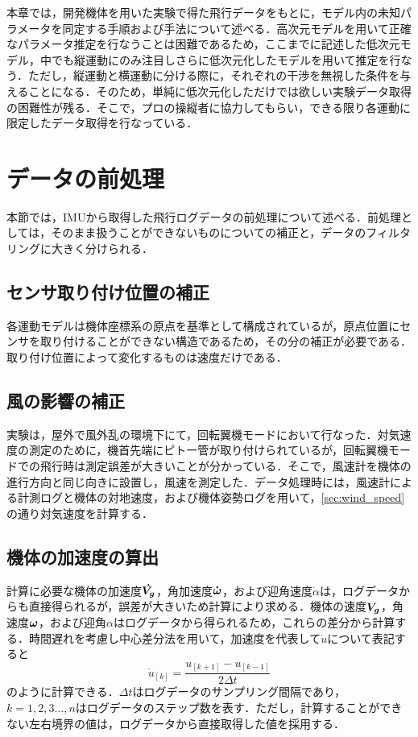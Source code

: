 
本章では，開発機体を用いた実験で得た飛行データをもとに，モデル内の未知パラメータを同定する手順および手法について述べる．高次元モデルを用いて正確なパラメータ推定を行なうことは困難であるため，ここまでに記述した低次元モデル，中でも縦運動にのみ注目しさらに低次元化したモデルを用いて推定を行なう．ただし，縦運動と横運動に分ける際に，それぞれの干渉を無視した条件を与えることになる．そのため，単純に低次元化しただけでは欲しい実験データ取得の困難性が残る．そこで，プロの操縦者に協力してもらい，できる限り各運動に限定したデータ取得を行なっている．\label{da}

\section{データの前処理}

本節では，IMUから取得した飛行ログデータの前処理について述べる．前処理としては，そのまま扱うことができないものについての補正と，データのフィルタリングに大きく分けられる．

\subsection{センサ取り付け位置の補正}

各運動モデルは機体座標系の原点を基準として構成されているが，原点位置にセンサを取り付けることができない構造であるため，その分の補正が必要である．取り付け位置によって変化するものは速度だけである．

\subsection{風の影響の補正}

実験は，屋外で風外乱の環境下にて，回転翼機モードにおいて行なった．対気速度の測定のために，機首先端にピトー管が取り付けられているが，回転翼機モードでの飛行時は測定誤差が大きいことが分かっている．そこで，風速計を機体の進行方向と同じ向きに設置し，風速を測定した．データ処理時には，風速計による計測ログと機体の対地速度，および機体姿勢ログを用いて，\ref{sec:wind_speed}の通り対気速度を計算する．

\subsection{機体の加速度の算出}

計算に必要な機体の加速度$\mbox{\boldmath $\dot{V_g}$}$，角加速度$\mbox{\boldmath $\dot{\omega}$}$，および迎角速度$\dot{\alpha}$は，ログデータからも直接得られるが，誤差が大きいため計算により求める．機体の速度$\mbox{\boldmath $V_g$}$，角速度$\mbox{\boldmath $\omega$}$，および迎角$\alpha$はログデータから得られるため，これらの差分から計算する．時間遅れを考慮し中心差分法を用いて，加速度を代表して$\dot{u}$について表記すると
\begin{equation}
  \dot{u}_{[k]} = \dfrac{u_{[k+1]}-u_{[k-1]}}{2\Delta t}
\end{equation}
のように計算できる．$\Delta t$はログデータのサンプリング間隔であり，$k=1,2,3\hdots,n$はログデータのステップ数を表す．ただし，計算することができない左右境界の値は，ログデータから直接取得した値を採用する．


